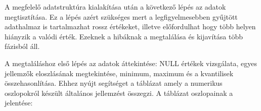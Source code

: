 
A megfelelő adatstruktúra kialakítása után a következő lépés az adatok megtisztítása. Ez a lépés azért szükséges mert a legfigyelmesebben gyűjtött adathalmaz is tartalmazhat rossz értékeket, illetve előfordulhat hogy több helyen hiányzik a valódi érték. Ezeknek a hibáknak a megtalálása és kijavítása több fázisból áll.

A megtaláláshoz első lépés az adatok áttekintése: NULL értékek vizsgálata, egyes jellemzők eloszlásának megtekintése, minimum, maximum és a kvantilisek összehasonlítása. Ehhez nyújt segítséget a  táblázat amely a numerikus oszlopokról készült általános jellemzést összegzi. A táblázat oszlopainak a jelentése:
